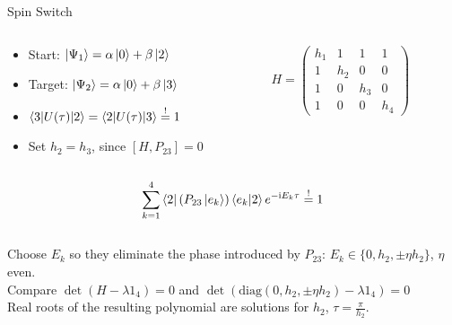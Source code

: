 \documentclass{beamer}
\newcommand{\mbeq}{\overset{!}{=}}
\begin{document}
\begin{frame}{Spin Switch}
	\begin{columns}[T]
		\begin{column}{0.6\textwidth}
   			\centering
   			\begin{itemize}
   				\item Start: $\ket{\Psi_1} = \alpha \ket{0} + \beta \ket{2}$
   				\item Target: $\ket{\Psi_2} = \alpha \ket{0} + \beta \ket{3}$
   				\item $\braket{3|U(\tau)|2} = \braket{2|U(\tau)|3} \mbeq 1$
   				\item Set $h_2 = h_3$, since $\left[H,P_{23}\right]=0$ 
   			\end{itemize}
		\end{column}
		\begin{column}{0.4\textwidth}
			\centering
    		$H = \begin{pmatrix}
			h_1 & 1 & 1 & 1 \\
			1 & h_2 & 0 & 0 \\
			1 & 0 & h_3 & 0 \\
			1 & 0 & 0 & h_4
\end{pmatrix}$
		\end{column}
	\end{columns}
	\[\sum_{k=1}^4\bra{2}(P_{23}\ket{e_k})\braket{e_k|2}e^{-\text{i}E_k\tau} \mbeq 1\]\\
   			Choose $E_k$ so they eliminate the phase introduced by $P_{23}$: $E_k \in \{0,h_2,\pm\eta h_2\}$, $\eta$ even.\\
   			Compare $\det(H-\lambda\text{1}_4) = 0$ and $\det(\text{diag}(0,h_2,\pm\eta h_2)-\lambda\text{1}_4) = 0$\\
   			Real roots of the resulting polynomial are solutions for $h_2$, $\tau = \frac{\pi}{h_2}$.
\end{frame}
\end{document}
